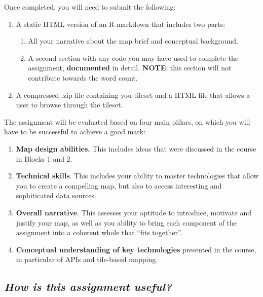 \documentclass[
  letterpaper,
  DIV=11,
  numbers=noendperiod]{scrreprt}
\begin{document}
Once completed, you will need to submit the following:

\begin{enumerate}
\def\labelenumi{\arabic{enumi}.}
\item
  A static HTML version of an R-markdown that includes two parts:

  \begin{enumerate}
  \def\labelenumii{\arabic{enumii}.}
  \item
    All your narrative about the map brief and conceptual background.
  \item
    A second section with any code you may have used to complete the
    assignment, \textbf{documented} in detail. \textbf{NOTE}: this
    section will not contribute towards the word count.
  \end{enumerate}
\item
  A compressed .zip file containing you tileset and a HTML file that
  allows a user to browse through the tileset.
\end{enumerate}

The assignment will be evaluated based on four main pillars, on which
you will have to be successful to achieve a good mark:

\begin{enumerate}
\def\labelenumi{\arabic{enumi}.}
\item
  \textbf{Map design abilities.} This includes ideas that were discussed
  in the course in Blocks 1 and 2.
\item
  \textbf{Technical skills}. This includes your ability to master
  technologies that allow you to create a compelling map, but also to
  access interesting and sophiticated data sources.
\item
  \textbf{Overall narrative}. This assesses your aptitude to introduce,
  motivate and justify your map, as well as you ability to bring each
  component of the assignment into a coherent whole that ``fits
  together''.
\item
  \textbf{Conceptual understanding of key technologies} presented in the
  course, in particular of APIs and tile-based mapping.
\end{enumerate}

\hypertarget{how-is-this-assignment-useful}{%
\subsection*{\texorpdfstring{\emph{How is this assignment
useful?}}{How is this assignment useful?}}\label{how-is-this-assignment-useful}}
\end{document}
